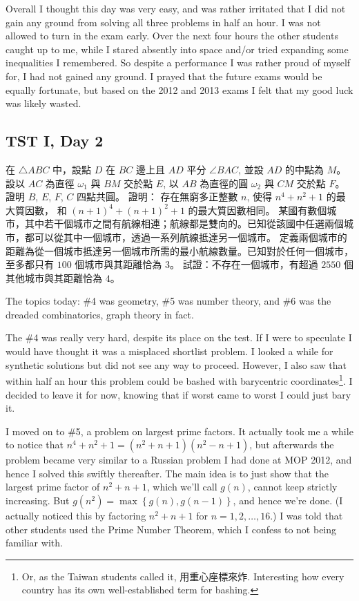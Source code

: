 \documentclass[11pt]{scrreprt}
\begin{document}
Overall I thought this day was very easy,
and was rather irritated that I did not gain any ground from solving all three problems in half an hour.
I was not allowed to turn in the exam early.
Over the next four hours the other students caught up to me,
while I stared absently into space and/or tried expanding some inequalities I remembered.
So despite a performance I was rather proud of myself for, I had not gained any ground.
I prayed that the future exams would be equally fortunate,
but based on the 2012 and 2013 exams I felt that my good luck was likely wasted.

\subsection{TST I, Day 2}
\begin{enumerate}
  \setcounter{enumi}{3}
  \ii 在 $\triangle ABC$ 中，設點 $D$ 在 $BC$ 邊上且 $AD$ 平分 $\angle BAC$, 並設 $AD$ 的中點為 $M$。
  設以 $AC$ 為直徑 $\omega_1$ 與 $BM$ 交於點 $E$, 以 $AB$ 為直徑的圓 $\omega_2$ 與 $CM$ 交於點 $F$。
  證明 $B$, $E$, $F$, $C$ 四點共圓。
  \ii 證明： 存在無窮多正整數 $n$, 使得 $n^4+n^2+1$ 的最大質因數， 和 $(n+1)^4+(n+1)^2+1$ 的最大質因數相同。 %
  \ii 某國有數個城市，其中若干個城市之間有航線相連；航線都是雙向的。已知從該國中任選兩個城市，都可以從其中一個城市，透過一系列航線抵達另一個城市。
  定義兩個城市的距離為從一個城市抵達另一個城市所需的最小航線數量。已知對於任何一個城市，至多都只有 $100$ 個城市與其距離恰為 $3$。
  試證：不存在一個城市，有超過 $2550$ 個其他城市與其距離恰為 $4$。%
\end{enumerate}
The topics today: \#4 was geometry, \#5 was number theory, and \#6 was the dreaded combinatorics,
graph theory in fact.

The \#4 was really very hard, despite its place on the test.
If I were to speculate I would have thought it was a misplaced shortlist problem.
I looked a while for synthetic solutions but did not see any way to proceed.
However, I also saw that within half an hour this problem could be bashed with
barycentric coordinates\footnote{Or, as the Taiwan students called it, 用重心座標來炸.
Interesting how every country has its own well-established term for bashing.}.
I decided to leave it for now, knowing that if worst came to worst I could just bary it.

I moved on to \#5, a problem on largest prime factors.
It actually took me a while to notice that $n^4+n^2+1=(n^2+n+1)(n^2-n+1)$,
but afterwards the problem became very similar to a Russian problem I had done at MOP 2012,
and hence I solved this swiftly thereafter.
The main idea is to just show that the largest prime factor of $n^2+n+1$, which we'll call $g(n)$,
cannot keep strictly increasing.  But $g(n^2) = \max \left\{ g(n), g(n-1) \right\}$, and hence we're done.
(I actually noticed this by factoring $n^2+n+1$ for $n=1,2,\dots,16$.) I was
told that other students used the Prime Number Theorem, which I confess to not being familiar with.
\end{document}
